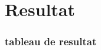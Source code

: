  \part{Resultat} %
 \label{prt:resultat_}
 
	\section{tableau de resultat} %
		\label{sec:tableau_de_resultat}


